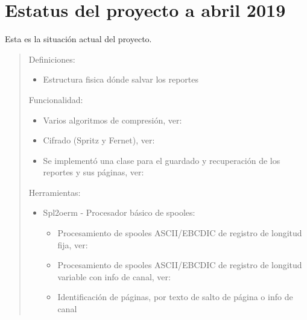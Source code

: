 \documentclass[a4paper,12pt,spanish]{sphinxmanual}
\begin{document}
\chapter{Estatus del proyecto a abril 2019}
\label{\detokenize{index:estatus-del-proyecto-a-abril-2019}}
Esta es la situación actual del proyecto.
\begin{quote}

Definiciones:
\begin{itemize}
\item {} 
Estructura fisica dónde salvar los reportes

\end{itemize}

Funcionalidad:
\begin{itemize}
\item {} 
Varios algoritmos de compresión, ver: {\hyperref[\detokenize{openerm.Compressor:module-openerm.Compressor}]{}}

\item {} 
Cifrado (Spritz y Fernet), ver: {\hyperref[\detokenize{openerm.Cipher:module-openerm.Cipher}]{}}

\item {} 
Se implementó una clase para el guardado y recuperación de los reportes y sus páginas, ver: {\hyperref[\detokenize{openerm.Database:module-openerm.Database}]{}}

\end{itemize}

Herramientas:
\begin{itemize}
\item {} 
Spl2oerm - Procesador básico de spooles:
\begin{itemize}
\item {} 
Procesamiento de spooles ASCII/EBCDIC de registro de longitud fija, ver: {\hyperref[\detokenize{openerm.SpoolFixedRecordLength:module-openerm.SpoolFixedRecordLength}]{}}

\item {} 
Procesamiento de spooles ASCII/EBCDIC de registro de longitud variable con info de canal, ver: {\hyperref[\detokenize{openerm.SpoolHostReprint:module-openerm.SpoolHostReprint}]{}}

\item {} 
Identificación de páginas, por texto de salto de página o info de canal


\end{itemize}
\end{itemize}
\end{quote}
\end{document}
